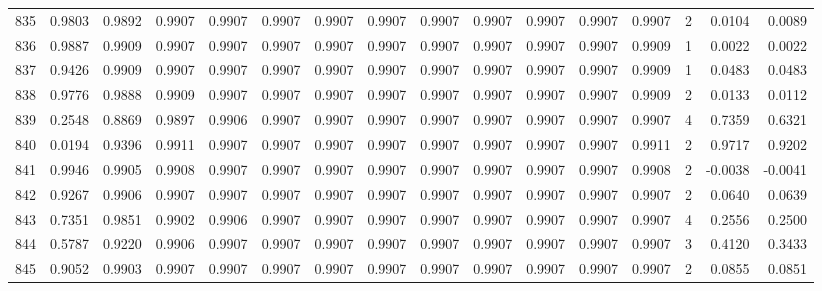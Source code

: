 \begin{tabular}{lrrrrrrrrrrrrrrr}
835 &      0.9803 &  0.9892 &  0.9907 &  0.9907 &  0.9907 &  0.9907 &  0.9907 &  0.9907 &  0.9907 &  0.9907 &   0.9907 &     0.9907 &      2 &                    0.0104 &                     0.0089 \\
836 &      0.9887 &  0.9909 &  0.9907 &  0.9907 &  0.9907 &  0.9907 &  0.9907 &  0.9907 &  0.9907 &  0.9907 &   0.9907 &     0.9909 &      1 &                    0.0022 &                     0.0022 \\
837 &      0.9426 &  0.9909 &  0.9907 &  0.9907 &  0.9907 &  0.9907 &  0.9907 &  0.9907 &  0.9907 &  0.9907 &   0.9907 &     0.9909 &      1 &                    0.0483 &                     0.0483 \\
838 &      0.9776 &  0.9888 &  0.9909 &  0.9907 &  0.9907 &  0.9907 &  0.9907 &  0.9907 &  0.9907 &  0.9907 &   0.9907 &     0.9909 &      2 &                    0.0133 &                     0.0112 \\
839 &      0.2548 &  0.8869 &  0.9897 &  0.9906 &  0.9907 &  0.9907 &  0.9907 &  0.9907 &  0.9907 &  0.9907 &   0.9907 &     0.9907 &      4 &                    0.7359 &                     0.6321 \\
840 &      0.0194 &  0.9396 &  0.9911 &  0.9907 &  0.9907 &  0.9907 &  0.9907 &  0.9907 &  0.9907 &  0.9907 &   0.9907 &     0.9911 &      2 &                    0.9717 &                     0.9202 \\
841 &      0.9946 &  0.9905 &  0.9908 &  0.9907 &  0.9907 &  0.9907 &  0.9907 &  0.9907 &  0.9907 &  0.9907 &   0.9907 &     0.9908 &      2 &                   -0.0038 &                    -0.0041 \\
842 &      0.9267 &  0.9906 &  0.9907 &  0.9907 &  0.9907 &  0.9907 &  0.9907 &  0.9907 &  0.9907 &  0.9907 &   0.9907 &     0.9907 &      2 &                    0.0640 &                     0.0639 \\
843 &      0.7351 &  0.9851 &  0.9902 &  0.9906 &  0.9907 &  0.9907 &  0.9907 &  0.9907 &  0.9907 &  0.9907 &   0.9907 &     0.9907 &      4 &                    0.2556 &                     0.2500 \\
844 &      0.5787 &  0.9220 &  0.9906 &  0.9907 &  0.9907 &  0.9907 &  0.9907 &  0.9907 &  0.9907 &  0.9907 &   0.9907 &     0.9907 &      3 &                    0.4120 &                     0.3433 \\
845 &      0.9052 &  0.9903 &  0.9907 &  0.9907 &  0.9907 &  0.9907 &  0.9907 &  0.9907 &  0.9907 &  0.9907 &   0.9907 &     0.9907 &      2 &                    0.0855 &                     0.0851 \\

\end{tabular}
